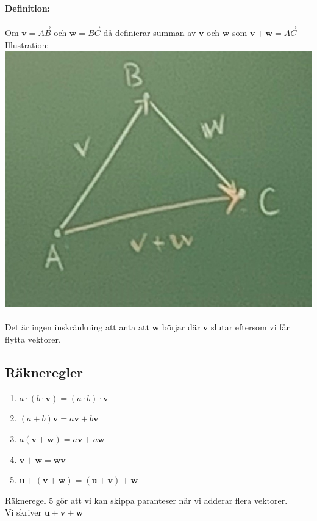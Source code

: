 \paragraph{Definition:} Om $\bm{v}=\overrightarrow{AB}$ och $\bm{w}=\overrightarrow{BC}$ då definierar \underline{summan av $\bm{v}$ och $\bm{w}$} som $\bm{v}+\bm{w}=\overrightarrow{AC}$\\
Illustration:\\
\includegraphics[scale=0.25]{imgs/22-01-17-img01.jpg}
~\\
Det är ingen inskränkning att anta att $\bm{w}$ börjar där $\bm{v}$ slutar eftersom vi får flytta vektorer.

\subsection{Räkneregler}
\begin{enumerate}
    \item $a\cdot (b\cdot \bm{v})=(a\cdot b)\cdot \bm{v}$
    \item $(a+b)\bm{v}=a\bm{v}+b\bm{v}$
    \item $a(\bm{v}+\bm{w})=a\bm{v}+a\bm{w}$
    \item $\bm{v}+\bm{w}=\bm{w}\bm{v}$
    \item $\bm{u}+(\bm{v}+\bm{w})=(\bm{u}+\bm{v})+\bm{w}$
\end{enumerate}
Räkneregel 5 gör att vi kan skippa paranteser när vi adderar flera vektorer.\\
Vi skriver $\bm{u}+\bm{v}+\bm{w}$